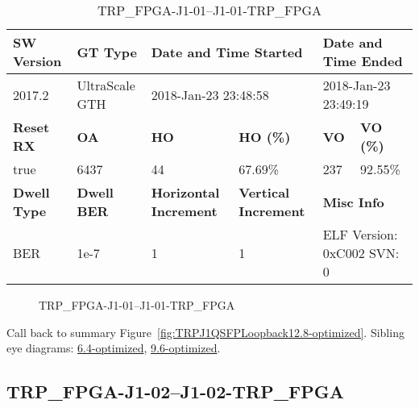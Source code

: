 \begin{table}[h]
\centering
\caption{TRP\_FPGA-J1-01--J1-01-TRP\_FPGA}
\label{tab:TRPFPGAJ101J101TRPFPGA12.8-optimized}
\begin{tabular}{@{}|l|l|l|l|l|l|@{}}
\toprule
\textbf{SW Version}                & \textbf{GT Type}   & \multicolumn{2}{l|}{\textbf{Date and Time Started}}            & \multicolumn{2}{l|}{\textbf{Date and Time Ended}}        \\ \midrule
2017.2                       & UltraScale GTH          & \multicolumn{2}{l|}{2018-Jan-23 23:48:58}                   & \multicolumn{2}{l|}{2018-Jan-23 23:49:19}               \\ \midrule
\textbf{Reset RX}                  & \textbf{OA} & \textbf{HO}   & \textbf{HO (\%)} & \textbf{VO} & \textbf{VO (\%)} \\ \midrule
true & 6437        & 44          & 67.69\%        & 237        & 92.55\%       \\ \midrule
\textbf{Dwell Type}                & \textbf{Dwell BER} & \textbf{Horizontal Increment} & \textbf{Vertical Increment}    & \multicolumn{2}{l|}{\textbf{Misc Info}}                  \\ \midrule
BER                            & 1e-7        & 1        & 1           & \multicolumn{2}{l|}{ELF Version: 0xC002 SVN: 0}                         \\ \bottomrule
\end{tabular}
\end{table}

\begin{figure}[h]
\caption{TRP\_FPGA-J1-01--J1-01-TRP\_FPGA} \label{fig:TRPFPGAJ101J101TRPFPGA12.8-optimized}
\end{figure}

Call back to summary Figure~\ref{fig:TRPJ1QSFPLoopback12.8-optimized}.
Sibling eye diagrams: \hyperref[sec:TRPFPGAJ101J101TRPFPGA6.4-optimized]{6.4-optimized}, \hyperref[sec:TRPFPGAJ101J101TRPFPGA9.6-optimized]{9.6-optimized}.

\clearpage
\newpage


\subsection{TRP\_FPGA-J1-02--J1-02-TRP\_FPGA}\label{sec:TRPFPGAJ102J102TRPFPGA12.8-optimized}

